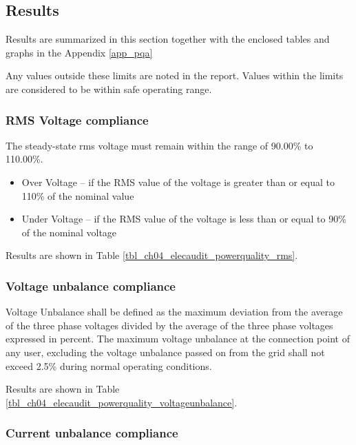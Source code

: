\subsection{Results}

Results are summarized in this section together with the enclosed tables and graphs in the Appendix \ref{app_pqa}

Any values outside these limits are noted in the report. Values within the limits are considered to be within safe operating range.

\subsubsection{RMS Voltage compliance}

The steady-state rms voltage must remain within the range of 90.00\% to 110.00\%.

\begin{itemize}
	\item 	Over Voltage – if the RMS value of the voltage is greater than or equal to 110\% of the nominal value
	\item 	Under Voltage – if the RMS value of the voltage is less than or equal to 90\% of the nominal voltage
\end{itemize}

Results are shown in Table \ref{tbl_ch04_elecaudit_powerquality_rms}.




\subsubsection{Voltage unbalance compliance}

Voltage Unbalance shall be defined as the maximum deviation from the average of the three phase voltages divided by the average of the three phase voltages expressed in percent.  The maximum voltage unbalance at the connection point of any user, excluding the voltage unbalance passed on from the grid shall not exceed 2.5\% during normal operating conditions.

Results are shown in Table \ref{tbl_ch04_elecaudit_powerquality_voltageunbalance}.



\subsubsection{Current unbalance compliance}

